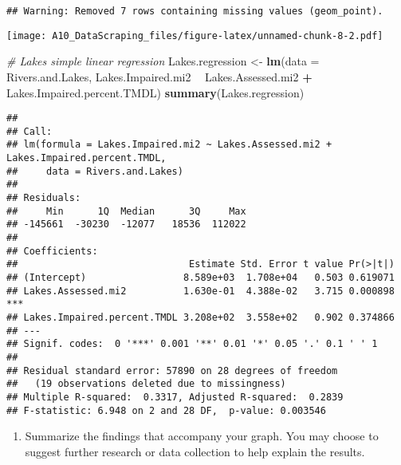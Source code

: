\documentclass[]{article}
\newenvironment{Shaded}{\begin{snugshade}}{\end{snugshade}}
\newcommand{\CommentTok}[1]{\textcolor[rgb]{0.56,0.35,0.01}{\textit{#1}}}
\newcommand{\DataTypeTok}[1]{\textcolor[rgb]{0.13,0.29,0.53}{#1}}
\newcommand{\KeywordTok}[1]{\textcolor[rgb]{0.13,0.29,0.53}{\textbf{#1}}}
\newcommand{\NormalTok}[1]{#1}
\newcommand{\OperatorTok}[1]{\textcolor[rgb]{0.81,0.36,0.00}{\textbf{#1}}}
\newcommand{\StringTok}[1]{\textcolor[rgb]{0.31,0.60,0.02}{#1}}
\providecommand{\tightlist}{%
  \setlength{\itemsep}{0pt}\setlength{\parskip}{0pt}}
\begin{document}
\begin{verbatim}
## Warning: Removed 7 rows containing missing values (geom_point).
\end{verbatim}

\texttt{[image: A10\_DataScraping\_files/figure-latex/unnamed-chunk-8-2.pdf]}

\begin{Shaded}
\begin{Highlighting}[]
\CommentTok{# Lakes simple linear regression}
\NormalTok{Lakes.regression <-}\StringTok{ }\KeywordTok{lm}\NormalTok{(}\DataTypeTok{data =}\NormalTok{ Rivers.and.Lakes, Lakes.Impaired.mi2 }\OperatorTok{~}\StringTok{ }\NormalTok{Lakes.Assessed.mi2 }\OperatorTok{+}\StringTok{ }\NormalTok{Lakes.Impaired.percent.TMDL)}
\KeywordTok{summary}\NormalTok{(Lakes.regression)}
\end{Highlighting}
\end{Shaded}

\begin{verbatim}
## 
## Call:
## lm(formula = Lakes.Impaired.mi2 ~ Lakes.Assessed.mi2 + Lakes.Impaired.percent.TMDL, 
##     data = Rivers.and.Lakes)
## 
## Residuals:
##     Min      1Q  Median      3Q     Max 
## -145661  -30230  -12077   18536  112022 
## 
## Coefficients:
##                              Estimate Std. Error t value Pr(>|t|)    
## (Intercept)                 8.589e+03  1.708e+04   0.503 0.619071    
## Lakes.Assessed.mi2          1.630e-01  4.388e-02   3.715 0.000898 ***
## Lakes.Impaired.percent.TMDL 3.208e+02  3.558e+02   0.902 0.374866    
## ---
## Signif. codes:  0 '***' 0.001 '**' 0.01 '*' 0.05 '.' 0.1 ' ' 1
## 
## Residual standard error: 57890 on 28 degrees of freedom
##   (19 observations deleted due to missingness)
## Multiple R-squared:  0.3317, Adjusted R-squared:  0.2839 
## F-statistic: 6.948 on 2 and 28 DF,  p-value: 0.003546
\end{verbatim}

\begin{enumerate}
\def\labelenumi{\arabic{enumi}.}
\setcounter{enumi}{11}
\tightlist
\item
  Summarize the findings that accompany your graph. You may choose to
  suggest further research or data collection to help explain the
  results.
\end{enumerate}
\end{document}

